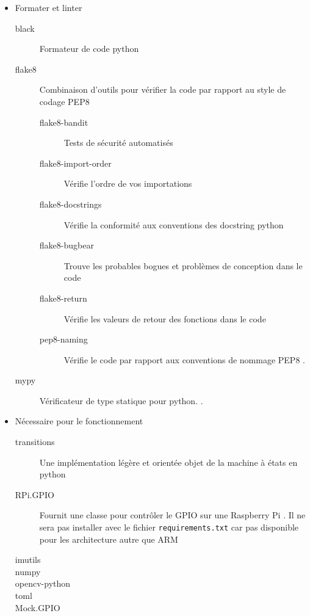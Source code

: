 \begin{itemize}
    \item Formater et linter
          \begin{description}
              \item[black] Formateur de code \gls{python} \cite{black}
              \item[flake8] Combinaison d'outils pour vérifier la code par rapport au style de codage PEP8
                  \cite{flake8, pep8}
                  \begin{description}
                      \item[flake8-bandit] Tests de sécurité automatisés \cite{flake8_bandit}
                      \item[flake8-import-order] Vérifie l'ordre de vos importations \cite{flake8_import_order}
                      \item[flake8-docstrings] Vérifie la conformité aux conventions des \gls{docstring} \gls{python}
                          \cite{flake8_docstrings}
                      \item[flake8-bugbear] Trouve les probables bogues et problèmes de conception dans le code
                          \cite{flake8_bugbear}
                      \item[flake8-return] Vérifie les valeurs de retour des fonctions dans le code \cite{flake8_return}
                      \item[pep8-naming] Vérifie le code par rapport aux conventions de nommage PEP8 \cite{pep8_naming, pep8}.
                  \end{description}
              \item[mypy]
                  Vérificateur de type statique pour \gls{python}. \cite{mypy}.
          \end{description}

    \item Nécessaire pour le fonctionnement
          \begin{description}
              \item[transitions] Une implémentation légère et orientée objet de la machine à états en \gls{python} \cite{transition}
              \item[RPi.GPIO] Fournit une classe pour contrôler le GPIO sur une Raspberry Pi \cite{rpi_gpio}.
                  {\color{red}Il ne sera pas installer avec le fichier \verb=requirements.txt= car pas disponible pour les architecture
                  autre que ARM}
              \item[imutils]
              \item[numpy]
              \item[opencv-python]
              \item[toml]
              \item[Mock.GPIO]
          \end{description}


\end{itemize}
